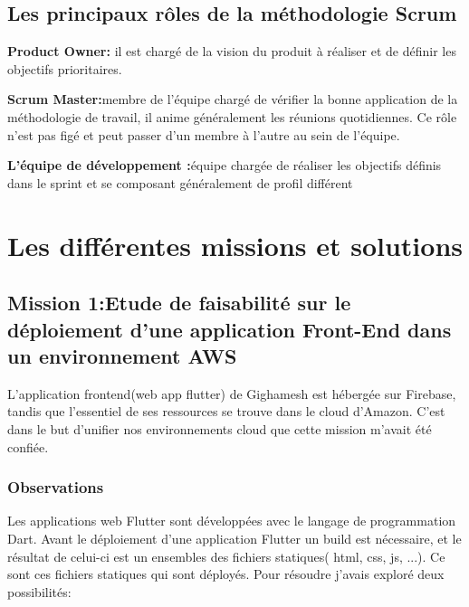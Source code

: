 \subsection{Les principaux rôles de la méthodologie Scrum}
\begin{list}{•}
\item  \textbf{ Product Owner:} il est chargé de la vision du produit à réaliser et de définir les objectifs prioritaires.
\item
\item  \textbf{ Scrum Master:}membre de l’équipe chargé de vérifier la bonne application de la méthodologie de travail, il anime généralement les réunions quotidiennes. Ce rôle n’est pas figé et peut passer d’un membre à l’autre au sein de l’équipe.
\item  \textbf{ L’équipe de développement :}équipe chargée de réaliser les objectifs définis dans le sprint et se composant généralement de profil différent
\end{list}  
\newpage
\section{Les différentes missions et solutions}
\subsection{Mission 1:Etude de faisabilité sur le déploiement d’une application Front-End dans un environnement AWS}
L’application frontend(web app flutter) de Gighamesh est hébergée sur Firebase, tandis que l’essentiel de
ses ressources se trouve dans le cloud d’Amazon. C’est dans le but d’unifier nos environnements cloud que
cette mission m’avait été confiée.
\subsubsection{Observations}
Les applications web Flutter sont  développées avec le langage de programmation Dart. Avant le déploiement d'une application Flutter un build est nécessaire, 
et le résultat de celui-ci est un ensembles des fichiers statiques( html, css, js, ...). Ce sont ces fichiers statiques qui sont déployés.
Pour résoudre  j’avais exploré deux possibilités:
